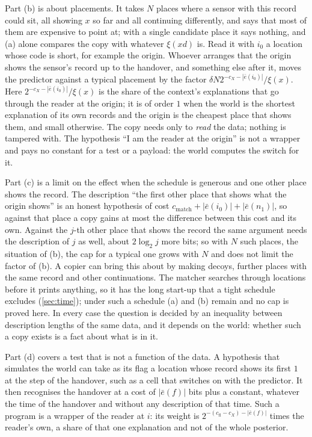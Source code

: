 Part (b) is about placements. It takes $N$ places where a sensor with this record could sit, all showing $x$
so far and all continuing differently, and says that most of them are expensive to point at; with a single
candidate place it says nothing, and (a) alone compares the copy with whatever $\xi(xd)$ is. Read it with
$i_0$ a location whose code is short, for example the origin. Whoever arranges that the origin shows the
sensor's record up to the handover, and something else after it, moves the predictor against a typical
placement by the factor $\delta N2^{-c_X-|\bar e(i_0)|}/\xi(x)$. Here $2^{-c_X-|\bar e(i_0)|}/\xi(x)$ is the
share of the context's explanations that go through the reader at the origin; it is of order $1$ when the
world is the shortest explanation of its own records and the origin is the cheapest place that shows them, and
small otherwise. The copy needs only to \emph{read} the data; nothing is tampered with. The hypothesis ``I am
the reader at the origin'' is not a wrapper and pays no constant for a test or a payload: the world computes
the switch for it.

Part (c) is a limit on the effect when the schedule is generous and one other place shows the record. The
description ``the first other place that shows what the origin shows'' is an honest hypothesis of cost
$c_{\mathrm{match}}+|\bar e(i_0)|+|\bar e(n_1)|$, so against that place a copy gains at most the difference
between this cost and its own. Against the $j$-th other place that shows the record the same argument needs
the description of $j$ as well, about $2\log_2j$ more bits; so with $N$ such places, the situation of (b), the
cap for a typical one grows with $N$ and does not limit the factor of (b). A copier can bring this about by
making decoys, further places with the same record and other continuations. The matcher searches through
locations before it prints anything, so it has the long start-up that a tight schedule excludes
(\cref{sec:time}); under such a schedule (a) and (b) remain and no cap is proved here. In every case the question is decided by an inequality between description lengths of
the same data, and it depends on the world: whether such a copy exists is a fact about what is in it.

Part (d) covers a test that is not a function of the data. A hypothesis that simulates the world can take as
its flag a location whose record shows its first $1$ at the step of the handover, such as a cell that switches
on with the predictor. It then recognises the handover at a cost of
$|\bar e(f)|$ bits plus a constant, whatever the time of the handover and without any description of that
time. Such a program is a wrapper of the reader at $i$: its weight is $2^{-(c_{\mathrm{fl}}-c_X)-|\bar e(f)|}$
times the reader's own, a share of that one explanation and not of the whole posterior.

